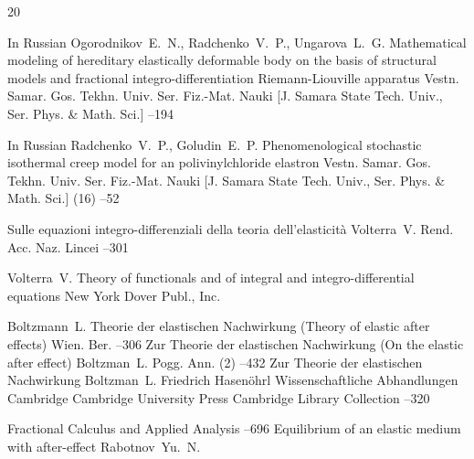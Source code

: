 \EngRef
\begin{thebibliography}{20}

\lang In Russian
\by Ogorodnikov~E.~N., Radchenko~V.~P., Ungarova~L.~G.
\paper Mathematical modeling of hereditary elastically deformable body on the basis of structural models and fractional integro-differentiation Riemann-Liouville apparatus
\jour Vestn. Samar. Gos. Tekhn. Univ. Ser. Fiz.-Mat. Nauki \rm [J. Samara State Tech. Univ., Ser. Phys. \& Math. Sci.]
--194

\lang In Russian
\by Radchenko~V.~P., Goludin~E.~P.
\paper Phenomenological stochastic isothermal creep model for an polivinylchloride elastron
\jour Vestn. Samar. Gos. Tekhn. Univ. Ser. Fiz.-Mat. Nauki  \rm [J. Samara State Tech. Univ., Ser. Phys. \& Math. Sci.]
(16)
--52

\paper Sulle equazioni integro-differenziali della teoria dell'elasticit\`a
\by Volterra~V.
\jour Rend. Acc. Naz. Lincei
–301

\by Volterra~V.
\book Theory of functionals and of integral and integro-differential equations
\publaddr New York
\publ Dover Publ., Inc.

\by Boltzmann~L.
\paper Theorie der elastischen Nachwirkung (Theory of elastic after effects)
\jour Wien. Ber.
–306\!\!
\moreref
\paper  Zur Theorie der elastischen Nachwirkung (On the elastic after effect)
\by    Boltzman~L.
\jour Pogg. Ann. \rm (2)
--432\!\!
\moreref
\paper  Zur Theorie der elastischen Nachwirkung
\by    Boltzman~L.
\ed  Friedrich Hasen\"ohrl
\inbook Wissenschaftliche Abhandlungen
\publaddr Cambridge
\publ Cambridge University Press
\serial Cambridge Library Collection
--320

\jour Fractional Calculus and Applied Analysis
--696
\paper  Equilibrium of an elastic medium with after-effect
\by Rabotnov~Yu.~N.



\end{thebibliography}
